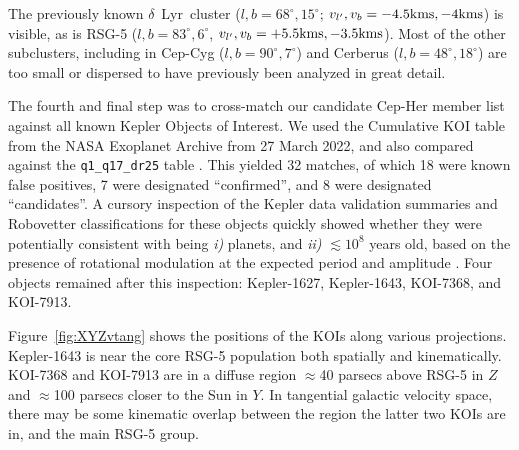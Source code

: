\documentclass[12pt,twocolumn,linenumbers]{aastex63}
\begin{document}
The previously known $\delta$~Lyr\ cluster ($l,b=68^\circ,15^\circ$;
$v_{l'}, v_b=-4.5{\rm kms},-4{\rm kms}$) is visible, as is RSG-5
($l,b=83^\circ,6^\circ$, $v_{l'}, v_b=+5.5{\rm kms},-3.5{\rm kms}$).
Most of the other subclusters, including in Cep-Cyg
($l,b=90^\circ,7^\circ$) and Cerberus ($l,b=48^\circ,18^\circ$) are
too small or dispersed to have previously been analyzed in great
detail.

%
%
The fourth and final step was to cross-match our candidate Cep-Her
member list against all known Kepler Objects of Interest.  We used the
Cumulative KOI table from the NASA Exoplanet Archive from 27 March
2022, and also compared against the \texttt{q1\_q17\_dr25} table
\citep{thompson_planetary_2018}.  This yielded 32 matches, of which 18
were known false positives, 7 were designated
``confirmed'', and 8 were designated ``candidates''.  A cursory
inspection of the Kepler data validation summaries and Robovetter
classifications for these objects quickly showed whether they were
potentially consistent with being {\it i)} planets, and {\it ii)}
$\lesssim 10^8$ years old, based on the presence of rotational
modulation at the expected period and amplitude \citep[{\it
e.g.},][Figure~9]{rebull_rotation_2020}.  Four objects remained after
this inspection: Kepler-1627, Kepler-1643, KOI-7368, and KOI-7913.

Figure~\ref{fig:XYZvtang} shows the positions of the KOIs along
various projections.  Kepler-1643 is near the core RSG-5 population
both spatially and kinematically.  KOI-7368 and KOI-7913 are in a 
diffuse region $\approx$40 parsecs above RSG-5 in $Z$ and $\approx$100
parsecs closer to the Sun in $Y$.  In tangential galactic velocity
space, there may be some kinematic overlap between the region the
latter two KOIs are in, and the main RSG-5 group.
\end{document}
